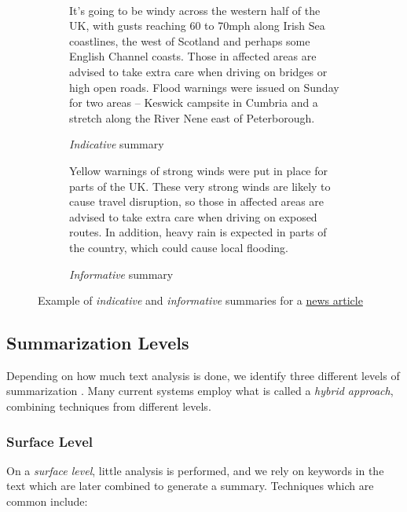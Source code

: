 \begin{figure}[H]\
\begin{subfigure}{\textwidth}
\begin{displayquote}
It’s going to be windy across the western half of the UK, with gusts reaching 60 to 70mph along Irish Sea coastlines, the west of Scotland and perhaps some English Channel coasts. Those in affected areas are advised to take extra care when driving on bridges or high open roads. Flood warnings were issued on Sunday for two areas – Keswick campsite in Cumbria and a stretch along the River Nene east of Peterborough.
\end{displayquote}
\caption{\textit{Indicative} summary}
\vspace{\baselineskip}
\end{subfigure}
\begin{subfigure}{\textwidth}
\begin{displayquote}
Yellow warnings of strong winds were put in place for parts of the UK. These very strong winds are likely to cause travel disruption, so those in affected areas are advised to take extra care when driving on exposed routes. In addition, heavy rain is expected in parts of the country, which could cause local flooding.
\caption{\textit{Informative} summary}
\end{displayquote}
\end{subfigure}
\caption{Example of \textit{indicative} and \textit{informative} summaries for a \href{https://www.theguardian.com/uk-news/2020/jan/12/storm-brendan-gales-forecast-uk}{news article}}
\label{fig:indicative_informative_summaries}
\end{figure}

\subsection{Summarization Levels}

Depending on how much text analysis is done, we identify three different levels of summarization \cite{lloret_text_2008}. Many current systems employ what is called a \textit{hybrid approach}, combining techniques from different levels.

\subsubsection{Surface Level}

On a \textit{surface level}, little analysis is performed, and we rely on keywords in the text which are later combined to generate a summary. Techniques which are common include:

